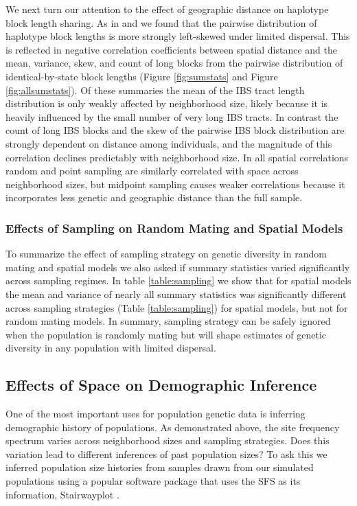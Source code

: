 \documentclass[11pt,twoside,lineno]{preprint}
\begin{document}
We next turn our attention to the effect of geographic distance on haplotype block length sharing. As in \citep{Ringbauer2017} and \citep{Baharian2016} we found that the pairwise distribution of haplotype block lengths is more strongly left-skewed under limited dispersal. This is reflected in negative correlation coefficients between spatial distance and the mean, variance, skew, and count of long blocks from the pairwise distribution of identical-by-state block lengths (Figure \ref{fig:sumstats} and Figure \ref{fig:allsumstats}). Of these summaries the mean of the IBS tract length distribution is only weakly affected by neighborhood size, likely because it is heavily influenced by the small number of very long IBS tracts. In contrast the count of long IBS blocks and the skew of the pairwise IBS block distribution are strongly dependent on distance among individuals, and the magnitude of this correlation declines predictably with neighborhood size. In all spatial correlations random and point sampling are similarly correlated with space across neighborhood sizes, but midpoint sampling causes weaker correlations because it incorporates less genetic and geographic distance than the full sample. 

\subsubsection{Effects of Sampling on Random Mating and Spatial Models}
To summarize the effect of sampling strategy on genetic diversity in random mating and spatial models we also asked if summary statistics varied significantly across sampling regimes. In table \ref{table:sampling} we show that for spatial models the mean and variance of nearly all summary statistics was significantly different across sampling strategies (Table \ref{table:sampling}) for spatial models, but not for random mating models. In summary, sampling strategy can be safely ignored when the population is randomly mating but will shape estimates of genetic diversity in any population with limited dispersal. 

\subsection{Effects of Space on Demographic Inference}
One of the most important uses for population genetic data is inferring demographic history of populations. As demonstrated above, the site frequency spectrum varies across neighborhood sizes and sampling strategies. Does this variation lead to different inferences of past population sizes? To ask this we inferred population size histories from samples drawn from our simulated populations using a popular software package that uses the SFS as its information, Stairwayplot \citep{Liu2015}.
\end{document}
